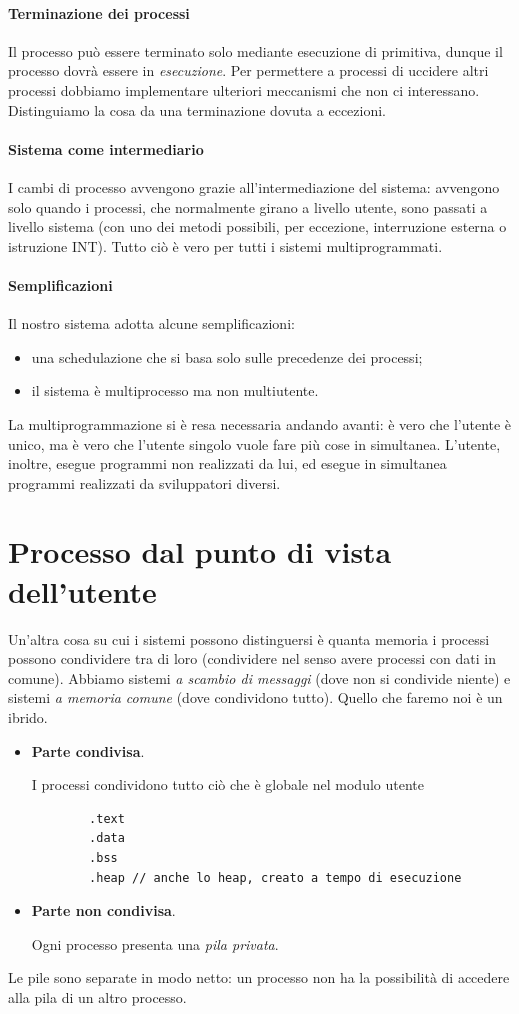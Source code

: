 \paragraph{Terminazione dei processi} Il processo può essere terminato solo mediante esecuzione di primitiva, dunque il processo dovrà essere in \emph{esecuzione}. Per permettere a processi di uccidere altri processi dobbiamo implementare ulteriori meccanismi che non ci interessano. Distinguiamo la cosa da una terminazione dovuta a eccezioni.

\paragraph{Sistema come intermediario} I cambi di processo avvengono grazie all'intermediazione del sistema: avvengono solo quando i processi, che normalmente girano a livello utente, sono passati a livello sistema (con uno dei metodi possibili, per eccezione, interruzione esterna o istruzione INT). Tutto ciò è vero per tutti i sistemi multiprogrammati. 

\paragraph{Semplificazioni} Il nostro sistema adotta alcune semplificazioni:
\begin{itemize}
	\item una schedulazione che si basa solo sulle precedenze dei processi;
	\item il sistema è multiprocesso ma non multiutente.
\end{itemize}
La multiprogrammazione si è resa necessaria andando avanti: è vero che l'utente è unico, ma è vero che l'utente singolo vuole fare più cose in simultanea. L'utente, inoltre, esegue programmi non realizzati da lui, ed esegue in simultanea programmi realizzati da sviluppatori diversi.
\clearpage 

\section{Processo dal punto di vista dell'utente}
Un'altra cosa su cui i sistemi possono distinguersi è quanta memoria i processi possono condividere tra di loro (condividere nel senso avere processi con dati in comune). Abbiamo sistemi \emph{a scambio di messaggi} (dove non si condivide niente) e sistemi \emph{a memoria comune} (dove condividono tutto). Quello che faremo noi è un ibrido.
\begin{itemize}
	\item \textbf{Parte condivisa}. 
	
	I processi condividono tutto ciò che è globale nel modulo utente
	\begin{verbatim}
		.text
		.data
		.bss
		.heap // anche lo heap, creato a tempo di esecuzione
	\end{verbatim}
	\item \textbf{Parte non condivisa}.
	
	Ogni processo presenta una \emph{pila privata}.
\end{itemize}
Le pile sono separate in modo netto: un processo non ha la possibilità di accedere alla pila di un altro processo.

